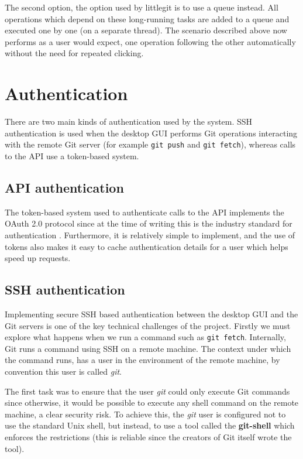 The second option, the option used by littlegit is to use a queue instead. All operations which depend on these long-running tasks are added to a queue and executed one by one (on a separate thread). The scenario described above now performs as a user would expect, one operation following the other automatically without the need for repeated clicking.

\section{Authentication}

There are two main kinds of authentication used by the system. SSH authentication is used when the desktop GUI performs Git operations interacting with the remote Git server (for example \texttt{git push} and \texttt{git fetch}), whereas calls to the API use a token-based system. 

\subsection{API authentication}

The token-based system used to authenticate calls to the API implements the OAuth 2.0 protocol since at the time of writing this is the industry standard for authentication \cite{oauth2}. Furthermore, it is relatively simple to implement, and the use of tokens also makes it easy to cache authentication details for a user which helps speed up requests.

\subsection{SSH authentication}

Implementing secure SSH based authentication between the desktop GUI and the Git servers is one of the key technical challenges of the project. Firstly we must explore what happens when we run a command such as \texttt{git fetch}. Internally, Git runs a command using SSH on a remote machine. The context under which the command runs, has a user in the environment of the remote machine, by convention this user is called \emph{git}. 

The first task was to ensure that the user \emph{git} could only execute Git commands since otherwise, it would be possible to execute any shell command on the remote machine, a clear security risk. To achieve this, the \emph{git} user is configured not to use the standard Unix shell, but instead, to use a tool called the \textbf{git-shell} \cite{git-shell} which enforces the restrictions (this is reliable since the creators of Git itself wrote the tool).

